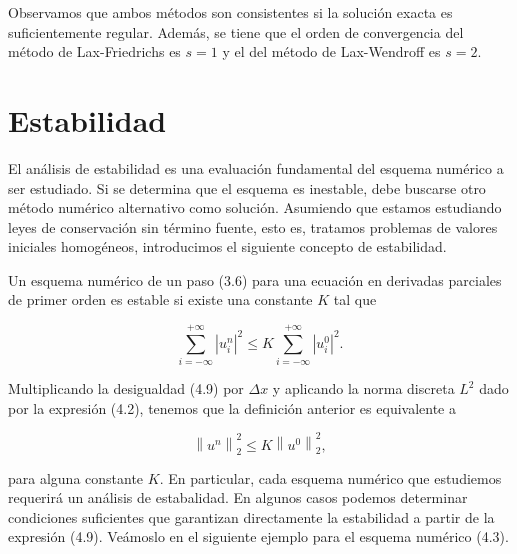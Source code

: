 Observamos que ambos métodos son consistentes si la solución exacta
es suficientemente regular.
Además, se tiene que el orden de convergencia del método de
Lax-Friedrichs es $s=1$ y el del método de Lax-Wendroff es $s=2$.

\section{Estabilidad}

El análisis de estabilidad es una evaluación fundamental del esquema
numérico a ser estudiado.
Si se determina que el esquema es inestable, debe buscarse otro
método numérico alternativo como solución.
Asumiendo que estamos estudiando leyes de conservación sin
término fuente, esto es, tratamos problemas de valores iniciales
homogéneos, introducimos el siguiente concepto de estabilidad.

\begin{definition}
  Un esquema numérico de un paso (3.6) para una ecuación en derivadas
  parciales de primer orden es estable si existe una constante $K$
  tal que

  \begin{equation*}
    \sum_{i=-\infty}^{+\infty}
    {\left|u^{n}_{i}\right|}^{2}\leq
    K
    \sum_{i=-\infty}^{+\infty}
    {\left|u^{0}_{i}\right|}^{2}.
  \end{equation*}
\end{definition}

Multiplicando la desigualdad (4.9) por $\Delta x$ y aplicando la
norma discreta $L^{2}$ dado por la expresión (4.2), tenemos que
la definición anterior es equivalente a

\begin{equation*}
  {\left\|u^{n}\right\|}^{2}_{2}\leq
  K
  {\left\|u^{0}\right\|}^{2}_{2},
\end{equation*}

para alguna constante $K$.
En particular, cada esquema numérico que estudiemos requerirá
un análisis de estabalidad. En algunos casos podemos determinar
condiciones suficientes que garantizan directamente la estabilidad a
partir de la expresión (4.9).
Veámoslo en el siguiente ejemplo para el esquema numérico (4.3).

